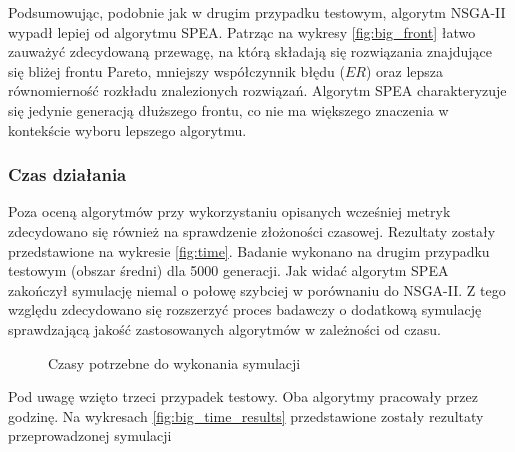 \documentclass[twoside]{iisthesis}
\begin{document}
Podsumowując, podobnie jak w drugim przypadku testowym, algorytm NSGA-II wypadł lepiej od algorytmu SPEA. Patrząc na wykresy \eqref{fig:big_front} łatwo zauważyć zdecydowaną przewagę, na którą składają się rozwiązania znajdujące się bliżej frontu Pareto, mniejszy współczynnik błędu ($ER$) oraz lepsza równomierność rozkładu znalezionych rozwiązań. Algorytm SPEA charakteryzuje się jedynie generacją dłuższego frontu, co nie ma większego znaczenia w kontekście wyboru lepszego algorytmu.

\subsubsection{Czas działania}
Poza oceną algorytmów przy wykorzystaniu opisanych wcześniej metryk zdecydowano się również na sprawdzenie złożoności czasowej. Rezultaty zostały przedstawione na wykresie \eqref{fig:time}. Badanie wykonano na drugim przypadku testowym (obszar średni) dla 5000 generacji. Jak widać algorytm SPEA zakończył symulację niemal o połowę szybciej w porównaniu do NSGA-II. Z tego względu zdecydowano się rozszerzyć proces badawczy o dodatkową symulację sprawdzającą jakość zastosowanych algorytmów w zależności od czasu.
\begin{figure}[H]
	\centering
	\caption{Czasy potrzebne do wykonania symulacji}
	\label{fig:time}
\end{figure}
Pod uwagę wzięto trzeci przypadek testowy. Oba algorytmy pracowały przez godzinę. Na wykresach \eqref{fig:big_time_results} przedstawione zostały rezultaty przeprowadzonej symulacji
\end{document}
